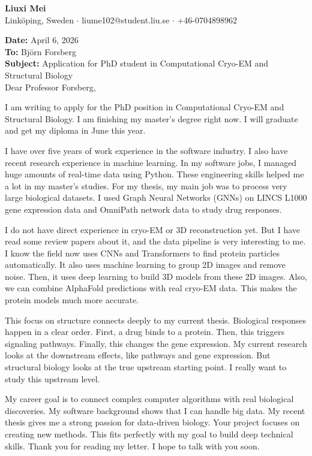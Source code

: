 \documentclass[11pt,a4paper]{article}
\begin{document}
\begin{center}
    {\LARGE \textbf{Liuxi Mei}} \\
    \vspace{2mm}
    Linköping, Sweden $\cdot$ liume102@student.liu.se $\cdot$ +46-0704898962
    \vspace{4mm}
\end{center}

\textbf{Date:} April 6, 2026 \\
\textbf{To:} Björn Forsberg \\
\textbf{Subject:} Application for PhD student in Computational Cryo-EM and Structural Biology \\

Dear Professor Forsberg,

I am writing to apply for the PhD position in Computational Cryo-EM and Structural Biology. I am finishing my master's degree right now. I will graduate and get my diploma in June this year.

I have over five years of work experience in the software industry. I also have recent research experience in machine learning. In my software jobs, I managed huge amounts of real-time data using Python. These engineering skills helped me a lot in my master's studies. For my thesis, my main job was to process very large biological datasets. I used Graph Neural Networks (GNNs) on LINCS L1000 gene expression data and OmniPath network data to study drug responses.

I do not have direct experience in cryo-EM or 3D reconstruction yet. But I have read some review papers about it, and the data pipeline is very interesting to me. I know the field now uses CNNs and Transformers to find protein particles automatically. It also uses machine learning to group 2D images and remove noise. Then, it uses deep learning to build 3D models from these 2D images. Also, we can combine AlphaFold predictions with real cryo-EM data. This makes the protein models much more accurate.

This focus on structure connects deeply to my current thesis. Biological responses happen in a clear order. First, a drug binds to a protein. Then, this triggers signaling pathways. Finally, this changes the gene expression. My current research looks at the downstream effects, like pathways and gene expression. But structural biology looks at the true upstream starting point. I really want to study this upstream level.

My career goal is to connect complex computer algorithms with real biological discoveries. My software background shows that I can handle big data. My recent thesis gives me a strong passion for data-driven biology. Your project focuses on creating new methods. This fits perfectly with my goal to build deep technical skills. Thank you for reading my letter. I hope to talk with you soon.
\end{document}
